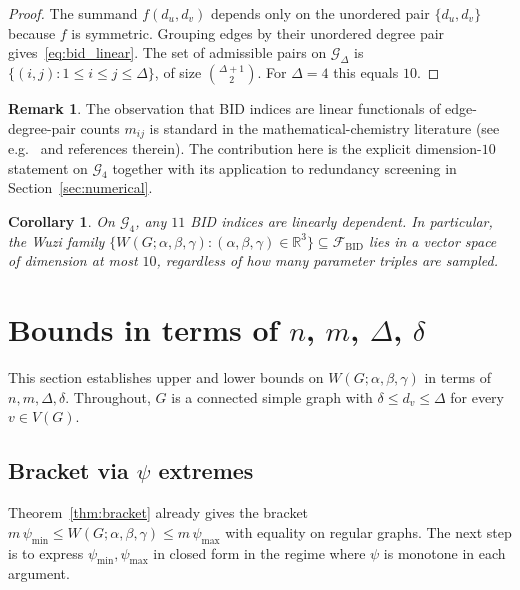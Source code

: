 \documentclass[11pt,a4paper]{article}
\newtheorem{corollary}[theorem]{Corollary}
\theoremstyle{definition}
\newtheorem{remark}[theorem]{Remark}
\newcommand{\Wuzi}{W(G;\alpha,\beta,\gamma)}
\newcommand{\bid}{\mathcal{F}_{\mathrm{BID}}}
\begin{document}
\begin{proof}
The summand $f(d_u,d_v)$ depends only on the unordered pair
$\{d_u,d_v\}$ because $f$ is symmetric. Grouping edges by their
unordered degree pair gives~\eqref{eq:bid_linear}. The set of
admissible pairs on $\mathcal{G}_\Delta$ is
$\{(i,j):1\le i\le j\le \Delta\}$, of size $\binom{\Delta+1}{2}$.
For $\Delta=4$ this equals $10$.
\end{proof}

\begin{remark}\label{rem:bid_credit}
The observation that BID indices are linear functionals of edge-
degree-pair counts $m_{ij}$ is standard in the mathematical-chemistry
literature (see e.g.~\cite{GutmanBorovicanin2018BID} and references
therein). The contribution here is the explicit dimension-$10$
statement on $\mathcal{G}_4$ together with its application to
redundancy screening in Section~\ref{sec:numerical}.
\end{remark}

\begin{corollary}\label{cor:bid_redundancy}
On $\mathcal{G}_4$, any $11$ BID indices are linearly dependent.
In particular, the Wuzi family
$\{\Wuzi:(\alpha,\beta,\gamma)\in\mathbb{R}^3\}\subseteq\bid$ lies
in a vector space of dimension at most $10$, regardless of how
many parameter triples are sampled.
\end{corollary}

\section{Bounds in terms of $n$, $m$, $\Delta$, $\delta$}\label{sec:bounds_nm}

This section establishes upper and lower bounds on $\Wuzi$ in
terms of $n,m,\Delta,\delta$. Throughout, $G$ is a connected simple
graph with $\delta\le d_v\le\Delta$ for every $v\in V(G)$.

\subsection{Bracket via $\psi$ extremes}

Theorem~\ref{thm:bracket} already gives the bracket
$m\,\psi_{\min}\le \Wuzi\le m\,\psi_{\max}$ with equality on
regular graphs. The next step is to express $\psi_{\min},\psi_{\max}$
in closed form in the regime where $\psi$ is monotone in each
argument.
\end{document}
